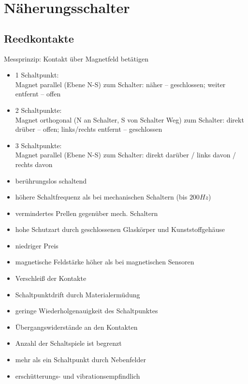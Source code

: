 \documentclass{scrreprt}
\begin{document}
\section{Näherungsschalter}
\subsection{Reedkontakte}
Messprinzip: Kontakt über Magnetfeld betätigen
\begin{itemize}
\item 1 Schaltpunkt:\\
Magnet parallel (Ebene N-S) zum Schalter: näher -- geschlossen; weiter entfernt -- offen
\item 2 Schaltpunkte:\\
Magnet orthogonal (N an Schalter, S von Schalter Weg) zum Schalter: direkt drüber -- offen; links/rechts entfernt -- geschlossen
\item 3 Schaltpunkte:\\
Magnet parallel (Ebene N-S) zum Schalter: direkt darüber / links davon / rechts davon
\end{itemize}
\begin{itemize}[label=$+$]
\item berührungslos schaltend
\item höhere Schaltfrequenz als bei mechanischen Schaltern (bis $200\unit{Hz}$)
\item vermindertes Prellen gegenüber mech. Schaltern
\item hohe Schutzart durch geschlossenen Glaskörper und Kunststoffgehäuse
\item niedriger Preis
\end{itemize}
\begin{itemize}[label=$-$]
\item magnetische Feldstärke höher als bei magnetischen Sensoren
\item Verschleiß der Kontakte
\item Schaltpunktdrift durch Materialermüdung
\item geringe Wiederholgenauigkeit des Schaltpunktes
\item Übergangswiderstände an den Kontakten
\item Anzahl der Schaltspiele ist begrenzt
\item mehr als ein Schaltpunkt durch Nebenfelder
\item erschütterungs- und vibrationsempfindlich
\end{itemize}
\end{document}
